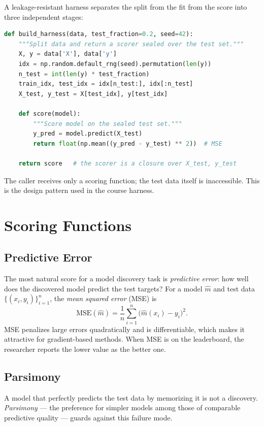A leakage-resistant harness separates the split from the fit from the score into three independent stages:
\begin{lstlisting}[language=python]
def build_harness(data, test_fraction=0.2, seed=42):
    """Split data and return a scorer sealed over the test set."""
    X, y = data['X'], data['y']
    idx = np.random.default_rng(seed).permutation(len(y))
    n_test = int(len(y) * test_fraction)
    train_idx, test_idx = idx[n_test:], idx[:n_test]
    X_test, y_test = X[test_idx], y[test_idx]

    def score(model):
        """Score model on the sealed test set."""
        y_pred = model.predict(X_test)
        return float(np.mean((y_pred - y_test) ** 2))  # MSE

    return score   # the scorer is a closure over X_test, y_test
\end{lstlisting}
The caller receives only a scoring function; the test data itself is inaccessible.
This is the design pattern used in the course harness.

\section{Scoring Functions}
\label{section:ScoringFunctions}

\subsection{Predictive Error}

The most natural score for a model discovery task is \emph{predictive error}: how well does the discovered model predict the test targets?
For a model $\hat{m}$ and test data $\{(x_i, y_i)\}_{i=1}^{n}$, the \emph{mean squared error} (MSE) is
\begin{equation}
\mathrm{MSE}(\hat{m}) = \frac{1}{n} \sum_{i=1}^{n} \bigl( \hat{m}(x_i) - y_i \bigr)^2 .
\label{equation:MSE}
\end{equation}
MSE penalizes large errors quadratically and is differentiable, which makes it attractive for gradient-based methods.
When MSE is on the leaderboard, the researcher reports the lower value as the better one.

\subsection{Parsimony}

A model that perfectly predicts the test data by memorizing it is not a discovery.
\emph{Parsimony} — the preference for simpler models among those of comparable predictive quality — guards against this failure mode.


